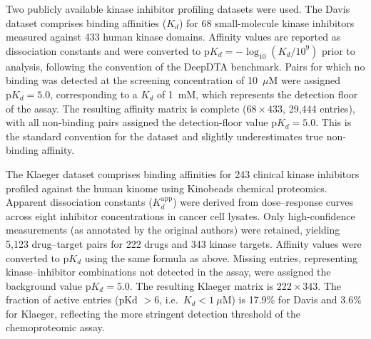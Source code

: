 \documentclass[journal=jcisd8,manuscript=article]{achemso}
\begin{document}
Two publicly available kinase inhibitor profiling datasets were used.
The Davis dataset\cite{Davis2011} comprises binding affinities ($K_d$) for 68
small-molecule kinase inhibitors measured against 433 human kinase domains.
Affinity values are reported as dissociation constants and were converted to
$\mathrm{p}K_d = -\log_{10}(K_d / 10^9)$ prior to analysis, following the
convention of the DeepDTA benchmark.\cite{DeepDTA}
Pairs for which no binding was detected at the screening concentration of
10~$\mu$M were assigned $\mathrm{p}K_d = 5.0$, corresponding to a $K_d$ of
1~mM, which represents the detection floor of the assay.
The resulting affinity matrix is complete ($68 \times 433$, 29{,}444 entries),
with all non-binding pairs assigned the detection-floor value
$\mathrm{p}K_d = 5.0$.
This is the standard convention for the dataset\cite{DeepDTA,Bosc2017} and
slightly underestimates true non-binding affinity.

The Klaeger dataset\cite{Klaeger2017} comprises binding affinities for 243
clinical kinase inhibitors profiled against the human kinome using
Kinobeads chemical proteomics.
Apparent dissociation constants ($K_d^\mathrm{app}$) were derived from
dose--response curves across eight inhibitor concentrations in cancer cell
lysates.
Only high-confidence measurements (as annotated by the original authors) were
retained, yielding 5{,}123 drug--target pairs for 222 drugs and 343 kinase
targets.
Affinity values were converted to $\mathrm{p}K_d$ using the same formula as
above.
Missing entries, representing kinase--inhibitor combinations not detected in
the assay, were assigned the background value $\mathrm{p}K_d = 5.0$.
The resulting Klaeger matrix is $222 \times 343$.
The fraction of active entries (pKd $> 6$, i.e.\ $K_d < 1~\mu$M) is 17.9\% for
Davis and 3.6\% for Klaeger, reflecting the more stringent detection threshold
of the chemoproteomic assay.
\end{document}
